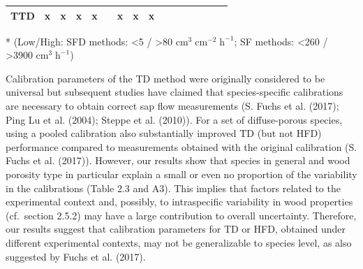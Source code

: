 \documentclass[11pt,twoside]{reedthesis}
\begin{document}
\begin{table}[!h]
\begin{threeparttable}
\begin{tabular}[t]{cccccccccccccccc}
TTD & x & x & x & x &  & x & x & x &  & \multicolumn{1}{c}{\cellcolor[HTML]{FFFFFF}{\textcolor[HTML]{FFFFFF}{0}}} & \multicolumn{1}{c}{\cellcolor[HTML]{FFFFFF}{\textcolor[HTML]{FFFFFF}{0}}} & \multicolumn{1}{c}{\cellcolor[HTML]{BBBBBB}{\textcolor[HTML]{BBBBBB}{1}}} & \multicolumn{1}{c}{\cellcolor[HTML]{FFFFFF}{\textcolor[HTML]{FFFFFF}{0}}} & \multicolumn{1}{c}{\cellcolor[HTML]{999999}{\textcolor[HTML]{999999}{2}}} & \multicolumn{1}{c}{\cellcolor[HTML]{FFFFFF}{\textcolor[HTML]{FFFFFF}{0}}}\\
\bottomrule
\end{tabular}
\begin{tablenotes}
\small
\item [*] (Low/High: SFD methods: <5 / >80 $\text{cm}^{3}\; \text{cm}^{-2}\; \text{h}^{-1}$; SF methods: <260 / >3900 $\text{cm}^3\; \text{h}^{-1}$)
\end{tablenotes}
\end{threeparttable}
\end{table}
Calibration parameters of the TD method were originally considered to be
universal but subsequent studies have claimed that species-specific
calibrations are necessary to obtain correct sap flow measurements (S.
Fuchs et al. (2017); Ping Lu et al. (2004); Steppe et al. (2010)). For a
set of diffuse-porous species, using a pooled calibration also
substantially improved TD (but not HFD) performance compared to
measurements obtained with the original calibration (S. Fuchs et al.
(2017)). However, our results show that species in general and wood
porosity type in particular explain a small or even no proportion of the
variability in the calibrations (Table 2.3 and A3). This implies that
factors related to the experimental context and, possibly, to
intraspecific variability in wood properties (cf.~section 2.5.2) may
have a large contribution to overall uncertainty. Therefore, our results
suggest that calibration parameters for TD or HFD, obtained under
different experimental contexts, may not be generalizable to species
level, as also suggested by Fuchs et al. (2017).\par
\end{document}
